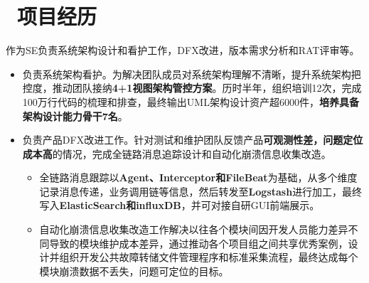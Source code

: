 \documentclass{resume}
\begin{document}



\section{\faBriefcase\ 项目经历}

\begin{onehalfspacing}
作为SE负责系统架构设计和看护工作，DFX改进，版本需求分析和RAT评审等。
\begin{itemize}
  \item 负责系统架构看护。为解决团队成员对系统架构理解不清晰，提升系统架构把控度，推动团队接纳\textbf{4+1视图架构管控方案}。历时半年，组织培训12次，完成100万行代码的梳理和排查，最终输出UML架构设计资产超6000件，\textbf{培养具备架构设计能力骨干7名}。
  \item 负责产品DFX改进工作。针对测试和维护团队反馈产品\textbf{可观测性差，问题定位成本高}的情况，完成全链路消息追踪设计和自动化崩溃信息收集改造。
    \begin{itemize}
        \item 全链路消息跟踪以\textbf{Agent、Interceptor和FileBeat}为基础，从多个维度记录消息传递，业务调用链等信息，然后转发至\textbf{Logstash}进行加工，最终写入\textbf{ElasticSearch和influxDB}，并可对接自研GUI前端展示。
        \item 自动化崩溃信息收集改造工作解决以往各个模块间因开发人员能力差异不同导致的模块维护成本差异，通过推动各个项目组之间共享优秀案例，设计并组织开发公共故障转储文件管理程序和标准采集流程，最终达成每个模块崩溃数据不丢失，问题可定位的目标。
    \end{itemize}
\end{itemize}
\end{onehalfspacing}
\end{document}
